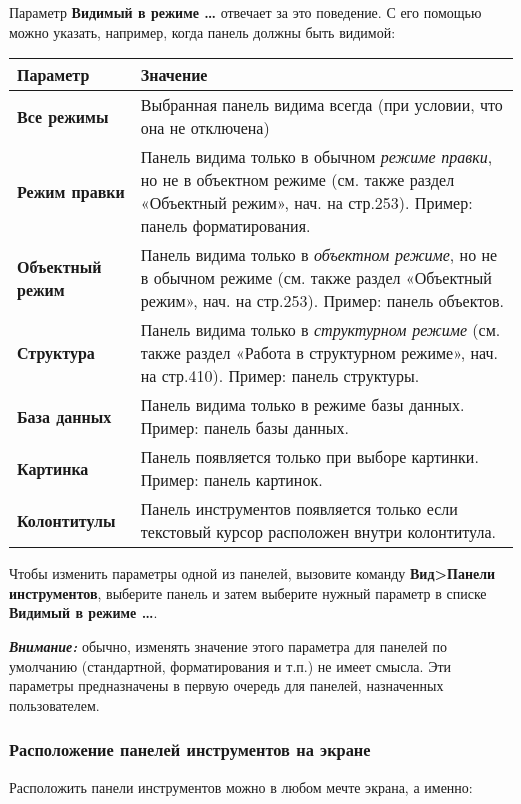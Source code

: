 ﻿\documentclass[a4paper,10pt]{article}
\begin{document}
Параметр \textbf{Видимый в режиме …} отвечает за это поведение. С его помощью можно указать, например, когда панель должны быть видимой:

\begin{tabular}{  m{4cm}  m{12cm}  }  
 \textbf{Параметр} & \textbf{Значение}\\ 
 \hline
  \textbf{Все режимы} & Выбранная панель видима всегда (при условии, что она не отключена)\\
  \textbf{Режим правки} & Панель видима только в обычном \textit{режиме правки}, но не в объектном режиме (см. также раздел «Объектный режим», нач. на стр.253). Пример: панель форматирования.\\ 
\textbf{Объектный режим} & Панель видима только в \textit{объектном режиме}, но не в обычном режиме (см. также раздел «Объектный режим», нач. на стр.253). Пример: панель объектов.\\
\textbf{Структура} & Панель видима только в \textit{структурном режиме} (см. также раздел «Работа в структурном режиме», нач. на стр.410). Пример: панель структуры.\\
\textbf{База данных} & Панель видима только в режиме базы данных. Пример: панель базы данных.\\
\textbf{Картинка} & Панель появляется только при выборе картинки. Пример: панель картинок.\\
\textbf{Колонтитулы} & Панель инструментов появляется только если текстовый курсор расположен внутри колонтитула.\\
\end{tabular} 

Чтобы изменить параметры одной из панелей, вызовите команду \textbf{Вид>Панели инструментов}, выберите панель и затем выберите нужный параметр в списке \textbf{Видимый в режиме …}.

\begin{mdframed}[backgroundcolor=blue!10]
\textbf{\textit{Внимание:}} обычно, изменять значение этого параметра для панелей по умолчанию (стандартной, форматирования и т.п.) не имеет смысла. Эти параметры предназначены в первую очередь для панелей, назначенных пользователем.
\end{mdframed}

\subsubsection{Расположение панелей инструментов на экране}
Расположить панели инструментов можно в любом мечте экрана, а именно:
\end{document}
